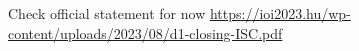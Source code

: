 Check official statement for now \url{https://ioi2023.hu/wp-content/uploads/2023/08/d1-closing-ISC.pdf}